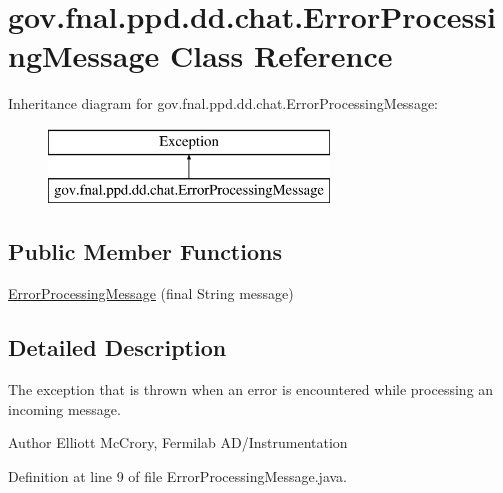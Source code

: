 \hypertarget{classgov_1_1fnal_1_1ppd_1_1dd_1_1chat_1_1ErrorProcessingMessage}{\section{gov.\-fnal.\-ppd.\-dd.\-chat.\-Error\-Processing\-Message Class Reference}
\label{classgov_1_1fnal_1_1ppd_1_1dd_1_1chat_1_1ErrorProcessingMessage}
}
Inheritance diagram for gov.\-fnal.\-ppd.\-dd.\-chat.\-Error\-Processing\-Message\-:\begin{figure}[H]
\begin{center}
\leavevmode
\includegraphics[height=2.000000cm]{classgov_1_1fnal_1_1ppd_1_1dd_1_1chat_1_1ErrorProcessingMessage}
\end{center}
\end{figure}
\subsection*{Public Member Functions}
\begin{DoxyCompactItemize}
\item 
\hyperlink{classgov_1_1fnal_1_1ppd_1_1dd_1_1chat_1_1ErrorProcessingMessage_a8bd09b8af0e6baf740f7e965086b15d8}{Error\-Processing\-Message} (final String message)
\end{DoxyCompactItemize}


\subsection{Detailed Description}
The exception that is thrown when an error is encountered while processing an incoming message.

\begin{DoxyAuthor}{Author}
Elliott Mc\-Crory, Fermilab A\-D/\-Instrumentation 
\end{DoxyAuthor}


Definition at line 9 of file Error\-Processing\-Message.\-java.



